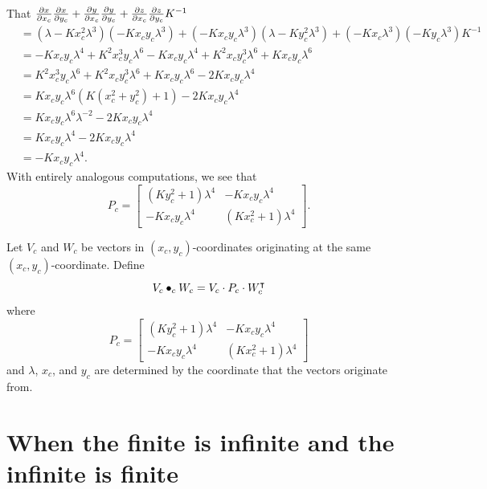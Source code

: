 \documentclass{ximera}
\begin{document}
\begin{problem}
\begin{freeResponse}
    That $\pp[x]{x_c}\pp[x]{y_c} + \pp[y]{x_c}\pp[y]{y_c} + \pp[z]{x_c}\pp[z]{y_c} K^{-1}$
    \begin{align*}
      &=\left(\lambda -Kx_c^2 \lambda^3\right)\left(-Kx_cy_c \lambda^3\right) + \left(-Kx_cy_c \lambda^3\right)\left(\lambda - Ky_c^2 \lambda^3\right) + \left(-Kx_c \lambda^3\right)\left(-Ky_c \lambda^3\right)K^{-1}\\
      &= -Kx_cy_c\lambda^4+K^2x_c^3y_c\lambda^6-Kx_cy_c\lambda^4+K^2x_cy_c^3\lambda^6+Kx_cy_c\lambda^6\\
      &= K^2x_c^3y_c\lambda^6+K^2x_cy_c^3\lambda^6+Kx_cy_c\lambda^6 -2Kx_cy_c\lambda^4\\
      &= Kx_cy_c\lambda^6\left(K\left(x_c^2 + y_c^2\right) + 1\right)-2Kx_cy_c\lambda^4\\
      &= Kx_cy_c\lambda^6\lambda^{-2} -2Kx_cy_c\lambda^4\\
      &= Kx_cy_c\lambda^4 -2Kx_cy_c\lambda^4\\
      &= -Kx_cy_c\lambda^4.
    \end{align*}
    With entirely analogous computations, we see that 
    \[
     P_c =
     \begin{bmatrix}
       \left(Ky_c^2+1\right)\lambda^4 & -Kx_{c}y_{c}\lambda^4\\
       -Kx_{c}y_{c}\lambda^4 & \left(Kx_c^2+1\right)\lambda^4
     \end{bmatrix}.
     \]
  \end{freeResponse}
\end{problem}


\begin{definition}
  Let $V_c$ and $W_c$ be vectors in $(x_c,y_c)$-coordinates
  originating at the same $(x_c,y_c)$-coordinate. Define
  \[
  V_c \bullet_c W_c = V_c \cdot P_c \cdot W_c^\transpose
  \]
  where
  \[
  P_c =
  \begin{bmatrix}
    \left(Ky_c^2+1\right)\lambda^4 & -Kx_{c}y_{c}\lambda^4\\
    -Kx_{c}y_{c}\lambda^4 & \left(Kx_c^2+1\right)\lambda^4
  \end{bmatrix}
  \]
  and $\lambda$, $x_c$, and $y_c$ are determined by the
  coordinate that the vectors originate from.
\end{definition}


\section{When the finite is infinite and the infinite is finite}
\end{document}
